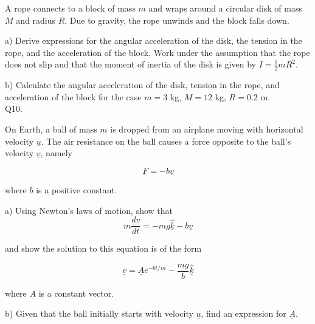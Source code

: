 \documentclass[a4paper,11pt]{article}
\begin{document}
\noindent A rope connects to a block of mass \( m \) and wraps around a circular disk of mass \( M \) and radius \( R \). Due to gravity, the rope unwinds and the block falls down. 

\medskip

\noindent a) Derive expressions for the angular acceleration of the disk, the tension in the rope, and the acceleration of the block. Work under the assumption that the rope does not slip and that the moment of inertia of the disk is given by \( I = \frac{1}{2} m R^{2} \).

\medskip

\noindent b) Calculate the angular acceleration of the disk, tension in the rope, and acceleration of the block for the case \( m = 3 \) kg, \( M = 12 \) kg, \( R = 0.2 \) m. \\

\noindent Q10. 

\noindent On Earth, a ball of mass \( m \) is dropped from an airplane moving with horizontal velocity \( \underline{u} \). The air resistance on the ball causes a force opposite to the ball's velocity \( \underline{v} \), namely 

\[ \underline{F} = - b \underline{v} \] 

\noindent where \( b \) is a positive constant. 

\medskip

\noindent a) Using Newton's laws of motion, show that 
\[
m\frac{d\underline{v}}{dt} = - mg \hat{\underline{k}} - b\underline{v} 
\]

\noindent and show the solution to this equation is of the form 

\[
\underline{v} = \underline{A} e^{-bt/m} - \frac{mg}{b} \hat{\underline{k}} 
\]

\noindent where \( \underline{A} \) is a constant vector.

\medskip

\noindent b) Given that the ball initially starts with velocity \( \underline{u} \), find an expression for \( \underline{A} \).
\end{document}
